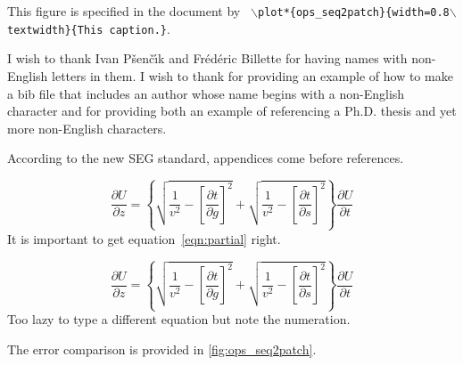 \documentclass[wordlite,texlive,final,calfont]{segabs}
\begin{document}
{This figure is specified in the
  document by \texttt{
    $\backslash$plot*\{ops\_seq2patch\}\{width=0.8$\backslash$textwidth\}\{This caption.\}}.  }

I wish to thank Ivan P\v{s}en\v{c}\'{\i}k and Fr\'ed\'eric Billette
for having names with non-English letters in them.  I wish to thank
\cite{Cerveny} for providing an example of how to make a bib file that
includes an author whose name begins with a non-English character and
\cite{forgues96} for providing both an example of referencing a Ph.D.
thesis and yet more non-English characters.


According to the new SEG standard, appendices come before references.

\begin{equation}
\frac{\partial U}{\partial z} = 
\left\{
  \sqrt{\frac{1}{v^2} - \left[\frac{\partial t}{\partial g}\right]^2} +
  \sqrt{\frac{1}{v^2} - \left[\frac{\partial t}{\partial s}\right]^2}
\right\}
\frac{\partial U}{\partial t}
\label{eqn:partial}
\end{equation}
It is important to get equation~\ref{eqn:partial} right.


\begin{equation}
\frac{\partial U}{\partial z} = 
\left\{
  \sqrt{\frac{1}{v^2} - \left[\frac{\partial t}{\partial g}\right]^2} +
  \sqrt{\frac{1}{v^2} - \left[\frac{\partial t}{\partial s}\right]^2}
\right\}
\frac{\partial U}{\partial t}
\label{eqn:partial2}
\end{equation}
Too lazy to type a different equation but note the numeration.

The error comparison is provided in \autoref{fig:ops_seq2patch}.
  
\lipsum[1-2]

\onecolumn

%

\twocolumn

\end{document}
